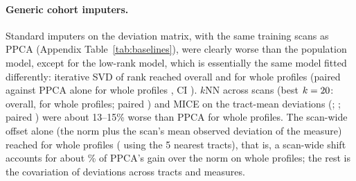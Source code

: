 \documentclass[11pt]{article}
\begin{document}
\paragraph{Generic cohort imputers.} Standard imputers on the deviation matrix, with the same training scans as PPCA
(Appendix Table~\ref{tab:baselines}), were clearly worse than the population model, except for the low-rank model, which
is essentially the same model fitted differently: iterative SVD of rank \blSvdBestName{} reached \blSvdBest{} overall and
\blSvdBestWhole{} for whole profiles (paired against PPCA alone for whole profiles \blSvdPairWhole, CI
\blSvdPairWholeCi). $k$NN across scans (best $k=20$: \blKnnBest{} overall, \blKnnBestWhole{} for whole
profiles; paired \blKnnPairWhole) and MICE on the tract-mean deviations (\blMice; \blMiceWhole; paired
\blMicePairWhole) were about 13--15\% worse than PPCA for whole profiles. The scan-wide offset alone (the norm plus the scan's
mean observed deviation of the measure) reached \blOffMeasureWhole{} for whole profiles (\blOffNearWhole{} using the 5
nearest tracts), that is, a scan-wide shift accounts for about \blOffShare\% of PPCA's gain over the norm on whole profiles; the rest
is the covariation of deviations across tracts and measures.
\end{document}
